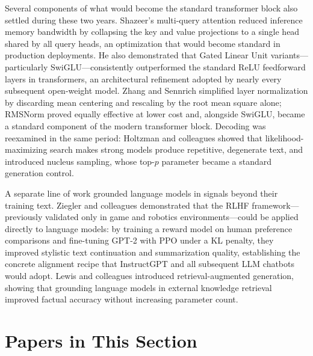 Several components of what would become the standard transformer block also settled during these two years. Shazeer's multi-query attention reduced inference memory bandwidth by collapsing the key and value projections to a single head shared by all query heads, an optimization that would become standard in production deployments. He also demonstrated that Gated Linear Unit variants---particularly SwiGLU---consistently outperformed the standard ReLU feedforward layers in transformers, an architectural refinement adopted by nearly every subsequent open-weight model. Zhang and Sennrich simplified layer normalization by discarding mean centering and rescaling by the root mean square alone; RMSNorm proved equally effective at lower cost and, alongside SwiGLU, became a standard component of the modern transformer block. Decoding was reexamined in the same period: Holtzman and colleagues showed that likelihood-maximizing search makes strong models produce repetitive, degenerate text, and introduced nucleus sampling, whose top-$p$ parameter became a standard generation control.

A separate line of work grounded language models in signals beyond their training text. Ziegler and colleagues demonstrated that the RLHF framework---previously validated only in game and robotics environments---could be applied directly to language models: by training a reward model on human preference comparisons and fine-tuning GPT-2 with PPO under a KL penalty, they improved stylistic text continuation and summarization quality, establishing the concrete alignment recipe that InstructGPT and all subsequent LLM chatbots would adopt. Lewis and colleagues introduced retrieval-augmented generation, showing that grounding language models in external knowledge retrieval improved factual accuracy without increasing parameter count.

\section*{Papers in This Section}

